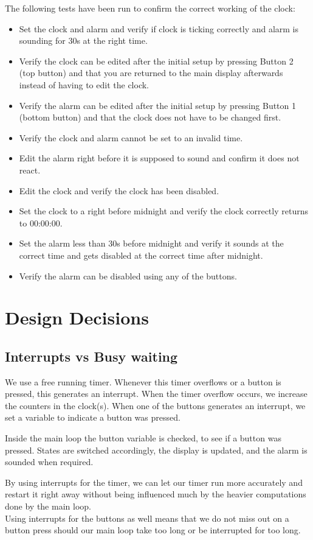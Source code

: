 \documentclass[11pt,a4paper]{scrartcl}
\begin{document}
The following tests have been run to confirm the correct working of the clock:
\begin{itemize}
\item Set the clock and alarm and verify if clock is ticking correctly and alarm is sounding for 30s at the right time.
\item Verify the clock can be edited after the initial setup by pressing Button 2 (top button) and that you are returned to the main display afterwards instead of having to edit the clock.
\item Verify the alarm can be edited after the initial setup by pressing Button 1 (bottom button) and that the clock does not have to be changed first. 
\item Verify the clock and alarm cannot be set to an invalid time.
\item Edit the alarm right before it is supposed to sound and confirm it does not react.
\item Edit the clock and verify the clock has been disabled.
\item Set the clock to a right before midnight and verify the clock correctly returns to 00:00:00.
\item Set the alarm less than 30s before midnight and verify it sounds at the correct time and gets disabled at the correct time after midnight.
\item Verify the alarm can be disabled using any of the buttons.
\end{itemize}

\section{Design Decisions}

\subsection{Interrupts vs Busy waiting}
We use a free running timer. Whenever this timer overflows or a button is pressed, this generates an interrupt. When the timer overflow occurs, we increase the counters in the clock(s). When one of the buttons generates an interrupt, we set a variable to indicate a button was pressed.

Inside the main loop the button variable is checked, to see if a button was pressed. States are switched accordingly, the display is updated, and the alarm is sounded when required.

By using interrupts for the timer, we can let our timer run more accurately and restart it right away without being influenced much by the heavier computations done by the main loop.\\
Using interrupts for the buttons as well means that we do not miss out on a button press should our main loop take too long or be interrupted for too long.
\end{document}
